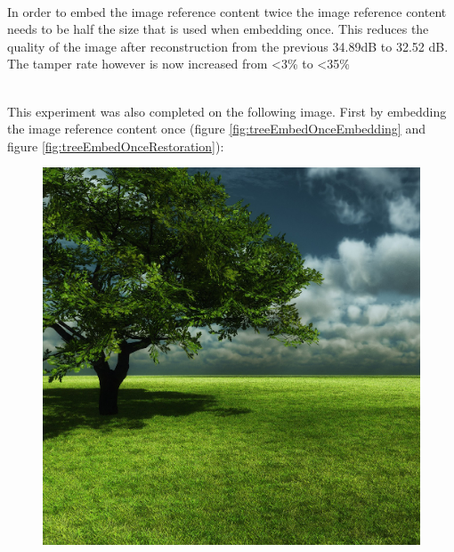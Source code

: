 \documentclass[12pt]{article}
\begin{document}
\hspace{0pt} \\
In order to embed the image reference content twice the image reference content needs to be half the size that is used when embedding once.
This reduces the quality of the image after reconstruction from the previous 34.89dB to 32.52 dB.
The tamper rate however is now increased from \textless 3\% to \textless 35\%

\hspace{0pt} \\
This experiment was also completed on the following image.
First by embedding the image reference content once (figure \ref{fig:treeEmbedOnceEmbedding} and figure \ref{fig:treeEmbedOnceRestoration}):

\begin{figure}[h]
\centerline{%
\includegraphics[scale=0.3375]{"tree"}%
\hspace{0.1cm}
}
\end{figure}
\end{document}
